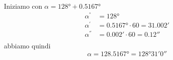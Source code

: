 	Iniziamo con
	$\alpha=\ang{128}+\ang{0.5167}$
	\begin{align*}
	\alpha^{\si{\degree}}&=\ang{128}\\
	\alpha^{\si{\arcminute}}&=\ang{0.5167}\cdot 60=\ang{;31.002;}\\
	\alpha^{\si{\arcsecond}}&=\ang{;0.002;}\cdot 60=\ang{;;0.12}\\
	\end{align*}
	abbiamo quindi
	\[\alpha=\ang{128.5167}=\ang{128;31;0}\]
